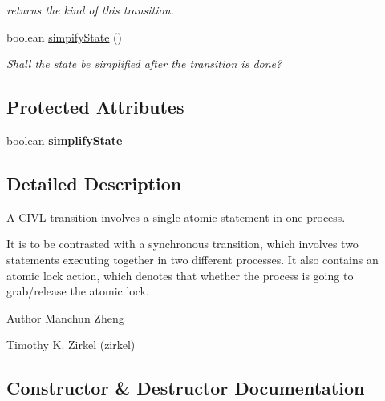 \begin{DoxyCompactItemize}
\begin{DoxyCompactList}\small\item\em returns the kind of this transition. \end{DoxyCompactList}\item 
boolean \hyperlink{classedu_1_1udel_1_1cis_1_1vsl_1_1civl_1_1semantics_1_1common_1_1CommonTransition_ae89be4c7716949d608ff0ceabc48e17a}{simpify\+State} ()
\begin{DoxyCompactList}\small\item\em Shall the state be simplified after the transition is done? \end{DoxyCompactList}\end{DoxyCompactItemize}
\subsection*{Protected Attributes}
\begin{DoxyCompactItemize}
\item 
\hypertarget{classedu_1_1udel_1_1cis_1_1vsl_1_1civl_1_1semantics_1_1common_1_1CommonTransition_ab20e236bdb3ea0949c0547ecfc2b3c8f}{}boolean {\bfseries simplify\+State}\label{classedu_1_1udel_1_1cis_1_1vsl_1_1civl_1_1semantics_1_1common_1_1CommonTransition_ab20e236bdb3ea0949c0547ecfc2b3c8f}

\end{DoxyCompactItemize}


\subsection{Detailed Description}
\hyperlink{structA}{A} \hyperlink{classedu_1_1udel_1_1cis_1_1vsl_1_1civl_1_1CIVL}{C\+I\+V\+L} transition involves a single atomic statement in one process. 

It is to be contrasted with a synchronous transition, which involves two statements executing together in two different processes. It also contains an atomic lock action, which denotes that whether the process is going to grab/release the atomic lock.

\begin{DoxyAuthor}{Author}
Manchun Zheng 

Timothy K. Zirkel (zirkel) 
\end{DoxyAuthor}


\subsection{Constructor \& Destructor Documentation}
\hypertarget{classedu_1_1udel_1_1cis_1_1vsl_1_1civl_1_1semantics_1_1common_1_1CommonTransition_a8fdd9eab98cbd5069668417ea09b906b}{}
